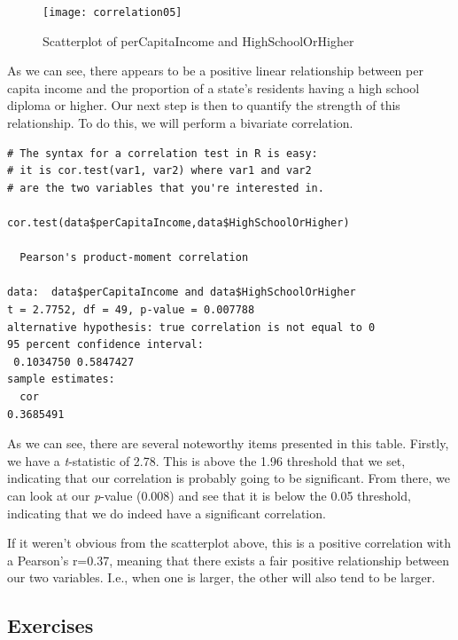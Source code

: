 \begin{figure}[h]
\texttt{[image: correlation05]}
\label{fig:correlation05}
\caption{Scatterplot of perCapitaIncome and HighSchoolOrHigher}
\end{figure}
As we can see, there appears to be a positive linear relationship between per capita income and the proportion of a state's residents having a high school diploma or higher. Our next step is then to quantify the strength of this relationship. To do this, we will perform a bivariate correlation.

\begin{framed}
\begin{Verbatim}[samepage=TRUE]
# The syntax for a correlation test in R is easy:
# it is cor.test(var1, var2) where var1 and var2
# are the two variables that you're interested in.

cor.test(data$perCapitaIncome,data$HighSchoolOrHigher)

  Pearson's product-moment correlation

data:  data$perCapitaIncome and data$HighSchoolOrHigher
t = 2.7752, df = 49, p-value = 0.007788
alternative hypothesis: true correlation is not equal to 0
95 percent confidence interval:
 0.1034750 0.5847427
sample estimates:
  cor 
0.3685491 
\end{Verbatim}
\end{framed}

As we can see, there are several noteworthy items presented in this table. Firstly, we have a \textit{t}-statistic of 2.78. This is above the 1.96 threshold that we set, indicating that our correlation is probably going to be significant. From there, we can look at our \textit{p}-value (0.008) and see that it is below the 0.05 threshold, indicating that we do indeed have a significant correlation.

If it weren't obvious from the scatterplot above, this is a positive correlation with a Pearson's r=0.37, meaning that there exists a fair positive relationship between our two variables. I.e., when one is larger, the other will also tend to be larger.

\subsection{Exercises}

